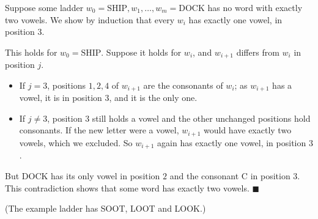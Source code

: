 Suppose some ladder $w_0=\text{SHIP},w_1,\dots,w_m=\text{DOCK}$ has no word with exactly two vowels. We show by induction that every $w_i$ has exactly one vowel, in position $3$.

This holds for $w_0=\text{SHIP}$. Suppose it holds for $w_i$, and $w_{i+1}$ differs from $w_i$ in position $j$.
\begin{itemize}
\item If $j=3$, positions $1,2,4$ of $w_{i+1}$ are the consonants of $w_i$; as $w_{i+1}$ has a vowel, it is in position $3$, and it is the only one.
\item If $j\ne3$, position $3$ still holds a vowel and the other unchanged positions hold consonants. If the new letter were a vowel, $w_{i+1}$ would have exactly two vowels, which we excluded. So $w_{i+1}$ again has exactly one vowel, in position $3$.
\end{itemize}
But DOCK has its only vowel in position $2$ and the consonant C in position $3$. This contradiction shows that some word has exactly two vowels. $\blacksquare$

(The example ladder has SOOT, LOOT and LOOK.)
